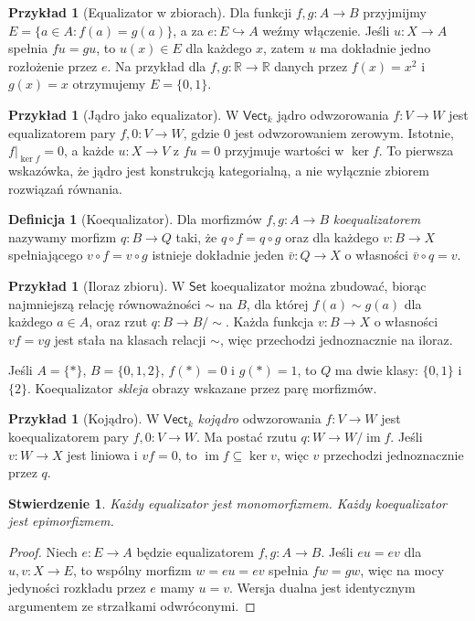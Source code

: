\documentclass[11pt,a4paper]{article}
\numberwithin{equation}{section}
\theoremstyle{plain}
\newtheorem{stwierdzenie}[twierdzenie]{Stwierdzenie}
\theoremstyle{definition}
\newtheorem{definicja}[twierdzenie]{Definicja}
\newtheorem{przyklad}[twierdzenie]{Przykład}
\theoremstyle{remark}
\newcommand{\cat}[1]{\mathsf{#1}}
\newcommand{\Set}{\cat{Set}}
\newcommand{\Vect}{\cat{Vect}}
\newcommand{\im}{\operatorname{im}}
\newcommand{\Ker}{\operatorname{ker}}
\begin{document}
\begin{przyklad}[Equalizator w zbiorach]
Dla funkcji $f,g:A\to B$ przyjmijmy $E=\{a\in A:f(a)=g(a)\}$, a za $e:E\hookrightarrow A$ weźmy włączenie. Jeśli $u:X\to A$ spełnia $fu=gu$, to $u(x)\in E$ dla każdego $x$, zatem $u$ ma dokładnie jedno rozłożenie przez $e$. Na przykład dla $f,g:\mathbb R\to\mathbb R$ danych przez $f(x)=x^2$ i $g(x)=x$ otrzymujemy $E=\{0,1\}$.
\end{przyklad}

\begin{przyklad}[Jądro jako equalizator]
W $\Vect_k$ jądro odwzorowania $f:V\to W$ jest equalizatorem pary $f,0:V\to W$, gdzie $0$ jest odwzorowaniem zerowym. Istotnie, $f|_{\Ker f}=0$, a każde $u:X\to V$ z $fu=0$ przyjmuje wartości w $\Ker f$. To pierwsza wskazówka, że jądro jest konstrukcją kategorialną, a nie wyłącznie zbiorem rozwiązań równania.
\end{przyklad}

\begin{definicja}[Koequalizator]\label{def:coeq}
Dla morfizmów $f,g:A\to B$ \emph{koequalizatorem} nazywamy morfizm $q:B\to Q$ taki, że $q\circ f=q\circ g$ oraz dla każdego $v:B\to X$ spełniającego $v\circ f=v\circ g$ istnieje dokładnie jeden $\bar v:Q\to X$ o własności $\bar v\circ q=v$.
\end{definicja}

\begin{przyklad}[Iloraz zbioru]
W $\Set$ koequalizator można zbudować, biorąc najmniejszą relację równoważności $\sim$ na $B$, dla której $f(a)\sim g(a)$ dla każdego $a\in A$, oraz rzut $q:B\to B/{\sim}$. Każda funkcja $v:B\to X$ o własności $vf=vg$ jest stała na klasach relacji $\sim$, więc przechodzi jednoznacznie na iloraz.

Jeśli $A=\{*\}$, $B=\{0,1,2\}$, $f(*)=0$ i $g(*)=1$, to $Q$ ma dwie klasy: $\{0,1\}$ i $\{2\}$. Koequalizator \emph{skleja} obrazy wskazane przez parę morfizmów.
\end{przyklad}

\begin{przyklad}[Kojądro]
W $\Vect_k$ \emph{kojądro} odwzorowania $f:V\to W$ jest koequalizatorem pary $f,0:V\to W$. Ma postać rzutu $q:W\to W/\im f$. Jeśli $v:W\to X$ jest liniowa i $vf=0$, to $\im f\subseteq\Ker v$, więc $v$ przechodzi jednoznacznie przez $q$.
\end{przyklad}

\begin{stwierdzenie}
Każdy equalizator jest monomorfizmem. Każdy koequalizator jest epimorfizmem.
\end{stwierdzenie}
\begin{proof}
Niech $e:E\to A$ będzie equalizatorem $f,g:A\to B$. Jeśli $eu=ev$ dla $u,v:X\to E$, to wspólny morfizm $w=eu=ev$ spełnia $fw=gw$, więc na mocy jedyności rozkładu przez $e$ mamy $u=v$. Wersja dualna jest identycznym argumentem ze strzałkami odwróconymi.
\end{proof}
\end{document}
